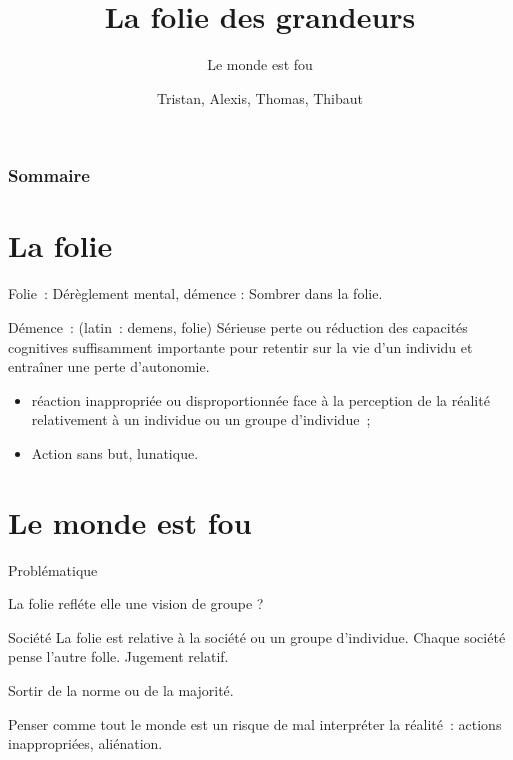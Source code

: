 \documentclass{beamer}
\title{La folie des grandeurs}
\subtitle{Le monde est fou}
\author{Tristan, Alexis, Thomas, Thibaut}
\begin{document}
\begin{frame}
  \titlepage
\end{frame}

\begin{frame}
    \frametitle{Sommaire}
    \begin{multicols}{2}
      {
		\setcounter{tocdepth}{1}
        \tableofcontents
      }
    \end{multicols}
\end{frame}

\section{La folie}

\begin{frame}
  \begin{displayquote}
    Folie~: Dérèglement mental, démence : Sombrer dans la folie.
    
    Démence~: (latin~: demens, folie) Sérieuse perte ou réduction des capacités cognitives suffisamment importante pour retentir sur la vie d'un individu et entraîner une perte d'autonomie.
  \end{displayquote}
\end{frame}

\begin{frame}
  \begin{itemize}
    \item réaction inappropriée ou disproportionnée face à la perception de la réalité relativement à un individue ou un groupe d'individue~;
    \item Action sans but, lunatique.
  \end{itemize}
\end{frame}

\section{Le monde est fou}

\begin{frame}{Problématique}
  \begin{center}
    La folie refléte elle une vision de groupe ?
  \end{center}
\end{frame}

\begin{frame}{Société}
  La folie est relative à la société ou un groupe d'individue.
  Chaque société pense l'autre folle. Jugement relatif.
  
  Sortir de la norme ou de la majorité.
  
  Penser comme tout le monde est un risque de mal interpréter la réalité~: actions inappropriées, aliénation.
\end{frame}
\end{document}
